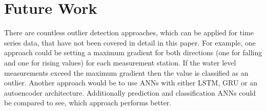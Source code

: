 \chapter{Future Work}
There are countless outlier detection approaches, which can be applied for time series data, that have not been covered in detail in this paper. For example, one approach could be setting a maximum gradient for both directions (one for falling and one for rising values) for each measurement station. If the water level measurements exceed the maximum gradient then the value is classified as an outlier. Another approach would be to use \acp{ANN} with either \ac{LSTM}, \ac{GRU} or an autoencoder architecture. Additionally prediction and classification \acp{ANN} could be compared to see, which approach performs better. 

